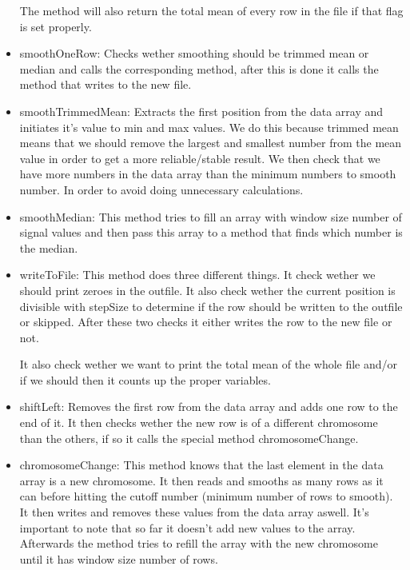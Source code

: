 \begin{itemize}
The method will also return the total mean of every row in the file if that flag is set properly.

\item smoothOneRow: Checks wether smoothing should be trimmed mean or median and calls the corresponding method, after this is done it calls the method that writes to the new file.

\item smoothTrimmedMean: Extracts the first position from the data array and initiates it's value to min and max values. We do this because trimmed mean means that we should remove the largest and smallest number from the mean value in order to get a more reliable/stable result. We then check that we have more numbers in the data array than the minimum numbers to smooth number. In order to avoid doing unnecessary calculations. 

\item smoothMedian: This method tries to fill an array with window size number of signal values and then pass this array to a method that finds which number is the median.

\item writeToFile: This method does three different things. It check wether we should print zeroes in the outfile. It also check wether the current position is divisible with stepSize to determine if the row should be written to the outfile or skipped.  After these two checks it either writes the row to the new file or not.

It also check wether we want to print the total mean of the whole file and/or if we should then it counts up the proper variables.

\item shiftLeft: Removes the first row from the data array and adds one row to the end of it.  It then checks wether the new row is of a different chromosome than the others, if so it calls the special method chromosomeChange.

\item chromosomeChange: This method knows that the last element in the data array is a new chromosome. It then reads and smooths as many rows as it can before hitting the cutoff number (minimum number of rows to smooth). It then writes and removes these values from the data array aswell. It's important to note that so far it doesn't add new values to the array. Afterwards the method tries to refill the array with the new chromosome until it has window size number of rows.



\end{itemize}



 